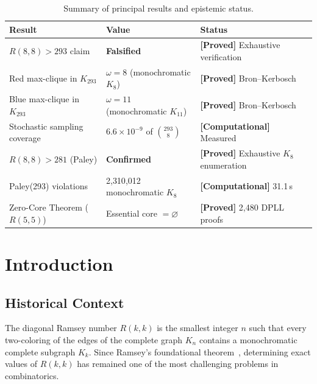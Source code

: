 \documentclass[12pt,a4paper]{article}
\newcommand{\proved}[1]{\textcolor{proved}{\textbf{[Proved]}} #1}
\newcommand{\computational}[1]{\textcolor{computational}{\textbf{[Computational]}} #1}
\theoremstyle{definition}
\theoremstyle{remark}
\newcommand{\Ramsey}[2]{R(#1,#2)}
\newcommand{\Kn}[1]{K_{#1}}
\begin{document}
\begin{table}[H]
\centering
\caption{Summary of principal results and epistemic status.}
\label{tab:summary}
\begin{tabular}{@{}lll@{}}
\toprule
\textbf{Result} & \textbf{Value} & \textbf{Status} \\
\midrule
$R(8,8) > 293$ claim & \textbf{Falsified} & \proved{Exhaustive verification} \\
Red max-clique in $\Kn{293}$ & $\omega = 8$ (monochromatic $K_8$) & \proved{Bron--Kerbosch} \\
Blue max-clique in $\Kn{293}$ & $\omega = 11$ (monochromatic $K_{11}$) & \proved{Bron--Kerbosch} \\
Stochastic sampling coverage & $6.6 \times 10^{-9}$ of $\binom{293}{8}$ & \computational{Measured} \\
$R(8,8) > 281$ (Paley) & \textbf{Confirmed} & \proved{Exhaustive $K_8$ enumeration} \\
Paley(293) violations & 2{,}310{,}012 monochromatic $K_8$ & \computational{31.1\,s} \\
Zero-Core Theorem ($R(5,5)$) & Essential core $= \varnothing$ & \proved{2{,}480 DPLL proofs} \\
\bottomrule
\end{tabular}
\end{table}

\section{Introduction}
\label{sec:intro}

\subsection{Historical Context}

The diagonal Ramsey number $\Ramsey{k}{k}$ is the smallest integer $n$ such that every two-coloring of the edges of the complete graph $\Kn{n}$ contains a monochromatic complete subgraph $K_k$.  Since Ramsey's foundational theorem~\cite{Ramsey1930}, determining exact values of $\Ramsey{k}{k}$ has remained one of the most challenging problems in combinatorics.
\end{document}
